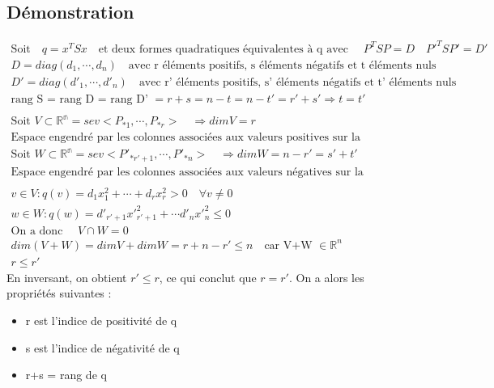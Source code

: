 \documentclass[a4paper]{book}
\begin{document}
\subsection{Démonstration}
\begin{gather*}
    \text{Soit} \quad q = x^TSx \quad \text{et deux formes quadratiques équivalentes à q avec } \quad P^TSP = D \quad P'^TSP' = D' \\
    D = diag(d_1,\cdots,d_n) \quad \text{avec r éléments positifs, s éléments négatifs et t éléments nuls} \\
    D' = diag(d'_1,\cdots,d'_n) \quad \text{avec r' éléments positifs, s' éléments négatifs et t' éléments nuls} \\
    \text{rang S = rang D = rang D' }=r+s=n-t=n-t'=r'+s' \Rightarrow t=t' \\ \\
    \text{Soit } V \subset \mathbb{R^n} = sev <P_{*1},\cdots,P_{*r}> \quad \Rightarrow dim V = r \\
    \text{Espace engendré par les colonnes associées aux valeurs positives sur la diagonale }\\
    \text{Soit } W \subset \mathbb{R^n} = sev <P'_{*r'+1},\cdots,P'_{*n}> \quad \Rightarrow dim W = n-r' = s'+t' \quad \\
    \text{Espace engendré par les colonnes associées aux valeurs négatives sur la diagonale } \\ \\
    v \in V : q(v) = d_1x_1^2 + \cdots + d_rx_r^2 > 0 \quad \forall v \neq 0 \\
    w \in W : q(w) = d'_{r'+1}x'^2_{r'+1}+\cdots d'_nx'^2_n \leq 0 \\
    \text{On a donc } \quad V \cap W = 0 \\
    dim(V+W) = dim V + dim W = r+n-r' \leq n \quad \text{car V+W $\in \mathbb{R}^n$} \\
    r \leq r'
\end{gather*}
En inversant, on obtient $r' \leq r$, ce qui conclut que $r = r'$. On a alors les propriétés suivantes :
\begin{itemize}
    \item r est l'indice de positivité de q
    \item s est l'indice de négativité de q
    \item r+s = rang de q
\end{itemize}
\end{document}

